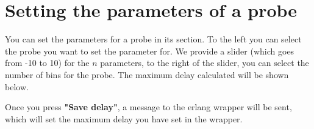 \section{Setting the parameters of a probe}
    You can set the parameters for a probe in its section.
    To the left you can select the probe you want to set the parameter for. 
    We provide a slider (which goes from -10 to 10) for the $n$ parameters, to the right of the slider, you can select the number of bins for the probe. The maximum delay calculated will be shown below.

    Once you press \textbf{"Save delay"}, a message to the erlang wrapper will be sent, which will set the maximum delay you have set in the wrapper.



